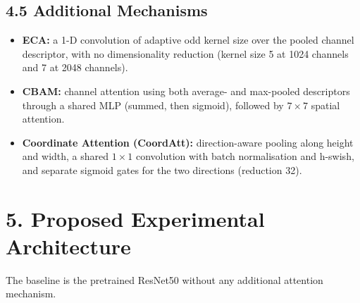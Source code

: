 \documentclass[10pt]{article}
\begin{document}
\subsection*{4.5 Additional Mechanisms}

\begin{itemize}
\item \textbf{ECA:} a 1-D convolution of adaptive odd kernel size over the pooled channel descriptor, with no dimensionality reduction (kernel size 5 at 1024 channels and 7 at 2048 channels).
\item \textbf{CBAM:} channel attention using both average- and max-pooled descriptors through a shared MLP (summed, then sigmoid), followed by $7\times7$ spatial attention.
\item \textbf{Coordinate Attention (CoordAtt):} direction-aware pooling along height and width, a shared $1\times1$ convolution with batch normalisation and h-swish, and separate sigmoid gates for the two directions (reduction 32).
\end{itemize}

\section*{5. Proposed Experimental Architecture}

The baseline is the pretrained ResNet50 without any additional attention
mechanism.

\begin{center}


\end{center}
\end{document}
